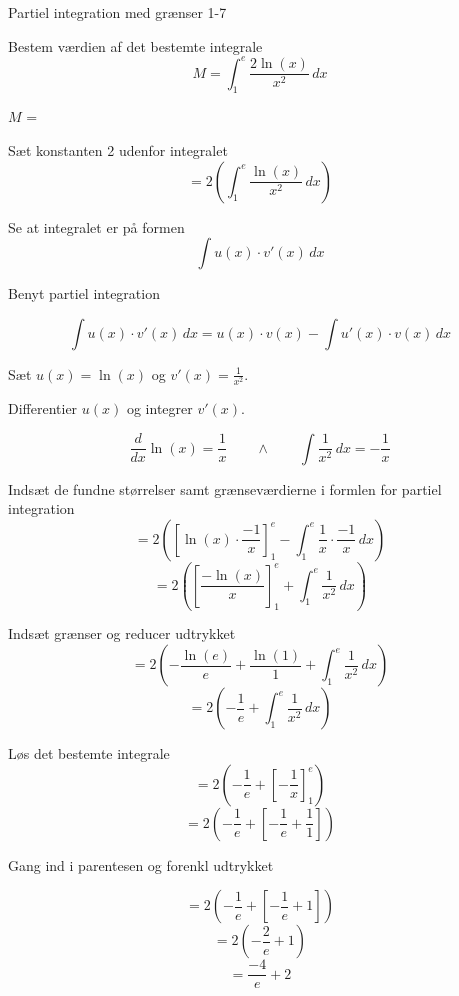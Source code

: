 \documentclass{article}
\begin{document}
\begin{exercise}{Partiel integration med grænser 1-7}


Bestem værdien af det bestemte integrale
\[
M = \int_1^e \frac{2 \ln(x)}{x^2} \, dx
\]

$M$ = 

\hint
Sæt konstanten 2 udenfor integralet
\[
= 2 \left( \int_1^e \frac{\ln(x)}{x^2} \, dx\right)
\]

\hint

Se at integralet er på formen
\[
\int u(x) \cdot v'(x) \, dx
\]

\hint

Benyt partiel integration

\hint
\[
\int u(x) \cdot v'(x)\, dx = u(x) \cdot v(x) - \int u'(x) \cdot v(x) \, dx
\]
\hint

Sæt $u(x) = \ln(x)$ og $v'(x) = \frac{1}{x^2}$.


\hint

Differentier $u(x)$ og integrer $v'(x)$.

\hint
\[
\frac{d}{dx} \ln(x) = \frac{1}{x} \qquad \wedge \qquad \int \frac{1}{x^2} \, dx = - \frac{1}{x}
\]

\hint

Indsæt de fundne størrelser samt grænseværdierne i formlen for partiel integration
\[
= 2 \left( \left[\ln(x) \cdot \frac{-1}{x} \right]_{1}^{e} - \int_{1}^{e} \frac{1}{x} \cdot \frac{-1}{x} \, dx \right)
\]
\[
=2 \left( \left[\frac{ - \ln(x)}{x} \right]_{1}^{e} + \int_{1}^{e} \frac{1}{x^2} \, dx \right)
\]

\hint

Indsæt grænser og reducer udtrykket
\[
= 2 \left(- \frac{\ln(e)}{e} + \frac{\ln(1)}{1} + \int_{1}^{e} \frac{1}{x^2} \, dx \right)
\]
\[
= 2 \left(- \frac{1}{e} + \int_{1}^{e} \frac{1}{x^2} \, dx \right)
\]

\hint
Løs det bestemte integrale
\[
= 2 \left(- \frac{1}{e} + \left[- \frac{1}{x}\right]_1^e\right)
\]
\[
= 2 \left(- \frac{1}{e} + \left[- \frac{1}{e} + \frac{1}{1}\right]\right)
\]

\hint
Gang ind i parentesen og forenkl udtrykket

\hint
\[
= 2 \left(- \frac{1}{e} + \left[- \frac{1}{e} + 1\right]\right)
\]
\[
= 2 \left(- \frac{2}{e} + 1\right)
\]
\[
= \frac{-4}{e} + 2
\]



\end{exercise}

\newpage
\end{document}
